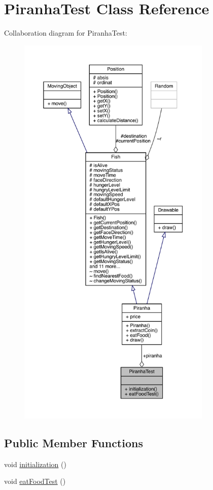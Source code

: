 \hypertarget{class_piranha_test}{}\section{Piranha\+Test Class Reference}
\label{class_piranha_test}


Collaboration diagram for Piranha\+Test\+:
\nopagebreak
\begin{figure}[H]
\begin{center}
\leavevmode
\includegraphics[height=550pt]{class_piranha_test__coll__graph}
\end{center}
\end{figure}
\subsection*{Public Member Functions}
\begin{DoxyCompactItemize}
\item 
void \mbox{\hyperlink{class_piranha_test_aa4e18322fef9deccb3fca9ca40ebb340}{initialization}} ()
\item 
void \mbox{\hyperlink{class_piranha_test_abfa9df41081adff1ecbc0fa3dd433ce8}{eat\+Food\+Test}} ()
\end{DoxyCompactItemize}
